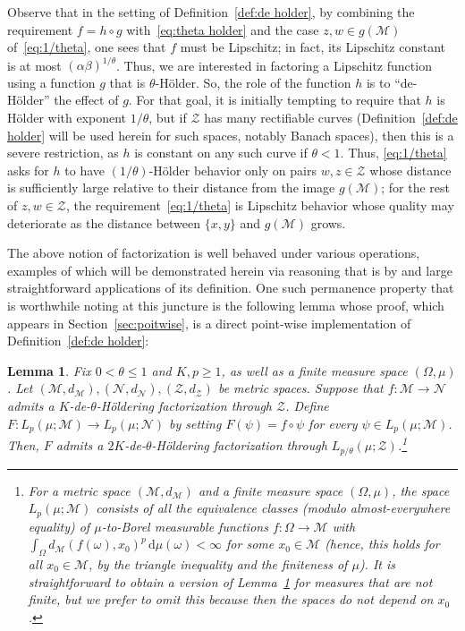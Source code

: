 \documentclass[11pt,reqno]{amsart}
\newtheorem{lemma}[theorem]{Lemma}
\renewcommand{\le}{\leqslant}
\renewcommand{\ge}{\geqslant}
\newcommand{\cZ}{\mathcal{Z}}
\newcommand{\NN}{\mathcal{N}}
\newcommand{\MM}{\mathcal{M}}
\newcommand{\ud}[0]{\,\mathrm{d}}
\begin{document}
Observe that in the setting of Definition~\ref{def:de holder}, by combining the requirement $f=h\circ g$ with~\eqref{eq:theta holder} and the case $z,w\in g(\MM)$ of~\eqref{eq:1/theta}, one sees that $f$ must be Lipschitz; in fact, its Lipschitz constant is at most $(\alpha\beta)^{1/\theta}$. Thus, we are interested in factoring a Lipschitz function using a function $g$ that is $\theta$-H\"older. So, the role of the function $h$ is to ``de-H\"older'' the effect of $g$. For that goal, it is initially tempting to require that  $h$ is H\"older with exponent $1/\theta$, but if $\cZ$  has many rectifiable curves (Definition~\ref{def:de holder} will be used herein for such spaces, notably Banach spaces), then this is a severe restriction, as $h$ is constant on any such curve if $\theta<1$. Thus, \eqref{eq:1/theta} asks for $h$ to  have $(1/\theta)$-H\"older behavior only on pairs $w,z\in \cZ$ whose distance is sufficiently large relative to their distance from the image $g(\MM)$; for the rest of $z,w\in \cZ$, the requirement~\eqref{eq:1/theta} is Lipschitz behavior whose quality may deteriorate as the distance between $\{x,y\}$ and $g(\MM)$ grows. 

The above notion of factorization is well behaved under various operations, examples of which will be demonstrated herein via reasoning that is by and large  straightforward applications of its definition. One such permanence property that is worthwhile noting at this juncture is the following lemma whose proof, which appears in Section~\ref{sec:poitwise}, is a direct point-wise implementation of Definition~\ref{def:de holder}: 




\begin{lemma}\label{lem:point-wise} Fix $0<\theta\le 1$ and $K,p\ge 1$, as well as a finite measure space $(\Omega,\mu)$. Let $(\MM,d_\MM), (\NN,d_\NN), (\cZ,d_\cZ)$  be metric spaces. Suppose that  $f:\MM\to \NN$  admits a $K$-de-$\theta$-H\"oldering factorization through  $\cZ$. Define $F:L_p(\mu;\MM)\to L_p(\mu;\NN)$ by setting $F(\psi)=f\circ \psi$ for every $\psi\in L_p(\mu;\MM)$.  Then, $F$ admits a $2K$-de-$\theta$-H\"oldering factorization through  $L_{p/\theta}(\mu;\cZ)$.\footnote{For a metric space $(\MM,d_\MM)$ and a finite measure space $(\Omega,\mu)$, the space $L_p(\mu;\MM)$ consists of all the equivalence classes (modulo almost-everywhere equality) of $\mu$-to-Borel measurable functions $f:\Omega\to \MM$ with $\int_\Omega d_\MM(f(\omega),x_0)^p\ud \mu(\omega)<\infty$ for some  $x_0\in \MM$  (hence, this holds for  all $x_0\in \MM$, by the triangle inequality and the finiteness of $\mu$). It is straightforward to obtain a version of Lemma~\ref{lem:point-wise} for measures that are not finite, but we prefer to omit this because then the spaces do not depend on $x_0$. }
\end{lemma}
\end{document}
